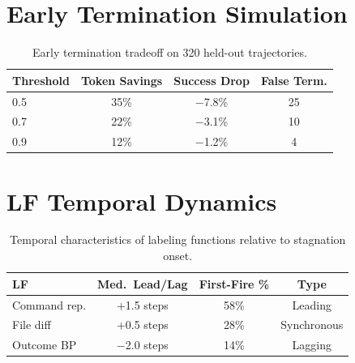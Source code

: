 \documentclass[11pt]{article}
\begin{document}
\section{Early Termination Simulation}
\label{app:termination}

\begin{table}[h]
\centering
\small
\begin{tabular}{lccc}
\toprule
\textbf{Threshold} & \textbf{Token Savings} & \textbf{Success Drop} & \textbf{False Term.} \\
\midrule
0.5 & 35\% & $-$7.8\% & 25 \\
0.7 & 22\% & $-$3.1\% & 10 \\
0.9 & 12\% & $-$1.2\% & 4 \\
\bottomrule
\end{tabular}
\caption{Early termination tradeoff on 320 held-out trajectories.}
\end{table}

\section{LF Temporal Dynamics}
\label{app:lf_temporal}

\begin{table}[h]
\centering
\small
\begin{tabular}{lccc}
\toprule
\textbf{LF} & \textbf{Med.\ Lead/Lag} & \textbf{First-Fire \%} & \textbf{Type} \\
\midrule
Command rep. & +1.5 steps & 58\% & Leading \\
File diff & +0.5 steps & 28\% & Synchronous \\
Outcome BP & $-$2.0 steps & 14\% & Lagging \\
\bottomrule
\end{tabular}
\caption{Temporal characteristics of labeling functions relative to stagnation onset.}
\end{table}
\end{document}
